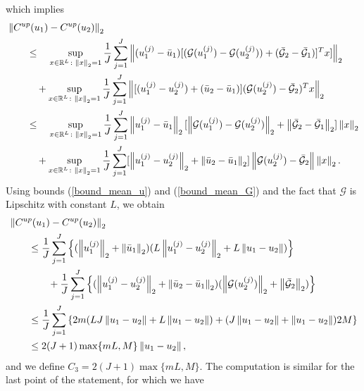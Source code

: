 which implies
\begin{align*}
& \left\|C^{up}(u_1) - C^{up}(u_2)\right\|_2 \\
& \qquad \le \quad \sup_{x \in \mathbb{R}^L \colon \left\|x\right\|_2 = 1} \frac{1}{J} \sum_{j=1}^J \left \lVert (u_1^{(j)} - \bar{u}_1) [ (\mathcal{G}(u_1^{(j)}) - \mathcal{G}(u_2^{(j)})) + (\bar{\mathcal{G}}_2 - \bar{\mathcal{G}}_1)]^T x ] \right \rVert_2 \\
& \qquad \quad + \sup_{x \in \mathbb{R}^L \colon \left\|x\right\|_2 = 1} \frac{1}{J} \sum_{j=1}^J \left \lVert [ (u_1^{(j)} - u_2^{(j)}) + (\bar{u}_2 - \bar{u}_1) ] (\mathcal{G}(u_2^{(j)}) - \bar{\mathcal{G}}_2)^T x \right \rVert_2 \\ 
& \qquad \le \quad \sup_{x \in \mathbb{R}^L \colon \left\|x\right\|_2 = 1} \frac{1}{J} \sum_{j=1}^J \left\|u_1^{(j)} - \bar{u}_1\right\|_2 [ \left\|\mathcal{G}(u_1^{(j)}) - \mathcal{G}(u_2^{(j)})\right\|_2 + \left\|\bar{\mathcal{G}}_2 - \bar{\mathcal{G}}_1\right\|_2 ] \left\|x\right\|_2 \\
& \qquad \quad + \sup_{x \in \mathbb{R}^L \colon \left\|x\right\|_2 = 1} \frac{1}{J} \sum_{j=1}^J [ \left\|u_1^{(j)} - u_2^{(j)}\right\|_2 + \left\|\bar{u}_2 - \bar{u}_1\right\|_2 ] \left\|\mathcal{G}(u_2^{(j)}) - \bar{\mathcal{G}}_2\right\| \left\|x\right\|_2.
\end{align*}
Using bounds (\ref{bound_mean_u}) and (\ref{bound_mean_G}) and the fact that $\mathcal{G}$ is Lipschitz with constant $L$, we obtain
\begin{align*}
& \left\|C^{up}(u_1) - C^{up}(u_2)\right\|_2 \\
& \qquad \le \frac{1}{J} \sum_{j=1}^J \left \{ (\left\|u_1^{(j)}\right\|_2 + \left\|\bar{u}_1\right\|_2) (L \left\|u_1^{(j)} - u_2^{(j)}\right\|_2 + L \left\|u_1 - u_2\right\|) \right \} \\
& \qquad \qquad + \frac{1}{J} \sum_{j=1}^J \left \{ (\left\|u_1^{(j)} - u_2^{(j)}\right\|_2 + \left\|\bar{u}_2 - \bar{u}_1\right\|_2) (\left\|\mathcal{G}(u_2^{(j)})\right\|_2 + \left\|\bar{\mathcal{G}}_2\right\|_2) \right \} \\
& \qquad \le \frac{1}{J} \sum_{j=1}^J \left \{ 2m ( LJ \left\|u_1 - u_2\right\| + L \left\|u_1 - u_2\right\| ) + ( J \left\|u_1 - u_2\right\| + \left\|u_1 - u_2\right\| ) 2M \right \} \\
& \qquad \le 2 (J+1) \max \{ mL, M \} \left\|u_1 - u_2\right\|,
\end{align*}
and we define $C_3 = 2 (J+1) \max \{ mL, M \}$. The computation is similar for the last point of the statement, for which we have
